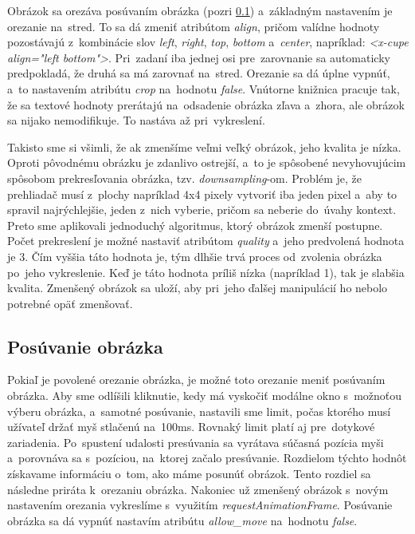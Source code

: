 Obrázok sa orezáva posúvaním obrázka (pozri \ref{sec:posuvanie-obrazka}) a~základným nastavením je orezanie na~stred. To sa dá zmeniť atribútom \emph{align}, pričom valídne hodnoty pozostávajú z~kombinácie slov \emph{left}, \emph{right}, \emph{top}, \emph{bottom} a~\emph{center}, napríklad: \emph{<x-cupe align="left bottom"\textgreater}. Pri~zadaní iba jednej osi pre~zarovnanie sa automaticky predpokladá, že druhá sa má zarovnať na~stred. Orezanie sa dá úplne vypnúť, a~to nastavením atribútu \emph{crop} na~hodnotu \emph{false}. Vnútorne knižnica pracuje tak, že sa textové hodnoty prerátajú na~odsadenie obrázka zľava a~zhora, ale obrázok sa nijako nemodifikuje. To nastáva až pri~vykreslení.

Takisto sme si všimli, že ak zmenšíme veľmi veľký obrázok, jeho kvalita je nízka. Oproti pôvodnému obrázku je zdanlivo ostrejší, a~to je spôsobené nevyhovujúcim spôsobom prekresľovania obrázka, tzv. \emph{downsampling}-om. Problém je, že prehliadač musí z~plochy napríklad 4x4 pixely vytvoriť iba jeden pixel a~aby to spravil najrýchlejšie, jeden z~nich vyberie, pričom sa neberie do~úvahy kontext. Preto sme aplikovali jednoduchý algoritmus, ktorý obrázok zmenší postupne. Počet prekreslení je možné nastaviť atribútom \emph{quality} a~jeho predvolená hodnota je 3. Čím vyššia táto hodnota je, tým dlhšie trvá proces od~zvolenia obrázka po~jeho vykreslenie. Keď je táto hodnota príliš nízka (napríklad 1), tak je slabšia kvalita. Zmenšený obrázok sa uloží, aby pri~jeho ďalšej manipulácií ho nebolo potrebné opäť zmenšovať.

\subsection{Posúvanie obrázka}
\label{sec:posuvanie-obrazka}

Pokiaľ je povolené orezanie obrázka, je možné toto orezanie meniť posúvaním obrázka. Aby sme odlíšili kliknutie, kedy má vyskočiť modálne okno s~možnoťou výberu obrázka, a~samotné posúvanie, nastavili sme limit, počas ktorého musí užívateľ držať myš stlačenú na~100ms. Rovnaký limit platí aj pre~dotykové zariadenia. Po~spustení udalosti presúvania sa vyrátava súčasná pozícia myši a~porovnáva sa s~pozíciou, na~ktorej začalo presúvanie. Rozdielom týchto hodnôt získavame informáciu o~tom, ako máme posunúť obrázok. Tento rozdiel sa následne priráta k~orezaniu obrázka. Nakoniec už zmenšený obrázok s~novým nastavením orezania vykreslíme s~využitím \emph{requestAnimationFrame}. Posúvanie obrázka sa dá vypnúť nastavím atribútu \emph{allow\_move} na~hodnotu \emph{false}.


